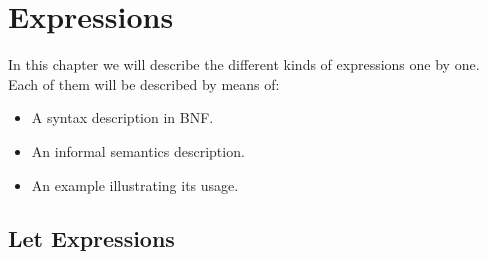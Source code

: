 \documentclass{overturerepchap}
\begin{document}
\chapter{Expressions}\label{chap:expr}

In this chapter we will describe the different kinds of expressions
one by one. Each of them will be described by means of:
\begin{itemize}
\item A syntax description in BNF.
\item An informal semantics description.
\item An example illustrating its usage.
\end{itemize}

\section{Let Expressions}\label{let-exp}
\end{document}
